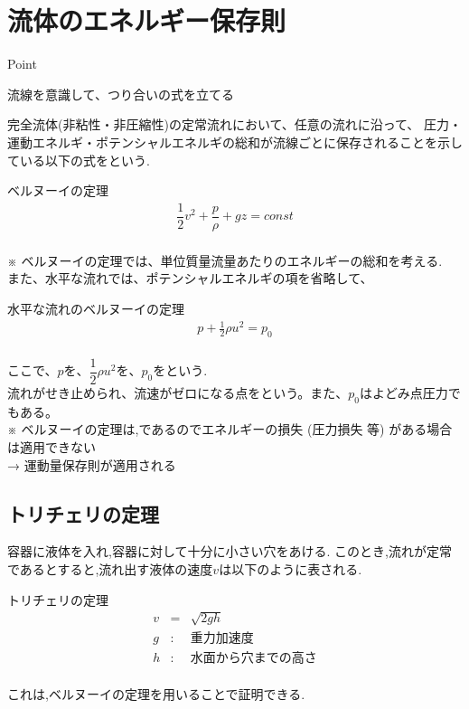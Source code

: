 \documentclass[a4paper]{jsarticle}
\begin{document}
\section{流体のエネルギー保存則}
\begin{itembox}[l]{Point}
    \begin{center}
        流線を意識して、つり合いの式を立てる
    \end{center}
\end{itembox}
完全流体(非粘性・非圧縮性)の定常流れにおいて、任意の流れに沿って、
圧力・運動エネルギ・ポテンシャルエネルギの総和が流線ごとに保存されることを示している以下の式をという.
\begin{itembox}[l]{ベルヌーイの定理}
    \begin{eqnarray*}
        \dfrac{1}{2}v^2+\dfrac{p}{\rho}+gz=const\\
    \end{eqnarray*}
\end{itembox}
※ ベルヌーイの定理では、単位質量流量あたりのエネルギーの総和を考える.\\
また、水平な流れでは、ポテンシャルエネルギの項を省略して、
\begin{itembox}[l]{水平な流れのベルヌーイの定理}
    \begin{eqnarray*}
        p+\frac{1}{2}\rho u^2 =p_0\\
    \end{eqnarray*}
\end{itembox}
ここで、$p$を、$\dfrac{1}{2}\rho u^2$を、$p_0$をという.\\
流れがせき止められ、流速がゼロになる点をという。また、$p_0$はよどみ点圧力でもある。\\
※ ベルヌーイの定理は,であるのでエネルギーの損失 (圧力損失 等) がある場合は適用できない\\
→ 運動量保存則が適用される\\
\subsection{トリチェリの定理}
容器に液体を入れ,容器に対して十分に小さい穴をあける.
このとき,流れが定常であるとすると,流れ出す液体の速度$v$は以下のように表される.
\begin{itembox}[l]{トリチェリの定理}
    \begin{eqnarray*}
        v&=&\sqrt{2gh}\\
        g&:&重力加速度\\
        h&:&水面から穴までの高さ\\
    \end{eqnarray*}
\end{itembox}
これは,ベルヌーイの定理を用いることで証明できる.
\end{document}
